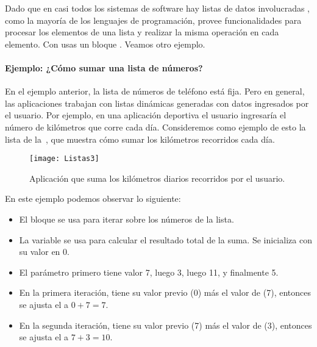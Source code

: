 {{Dado que en casi todos los sistemas de software hay listas de datos
involucradas \AppInventor, como la mayoría de los lenguajes de
programación, provee funcionalidades para procesar los elementos de
una lista y realizar la misma operación en cada elemento. Con
\AppInventor usas un bloque . Veamos otro
ejemplo.

\paragraph{Ejemplo: ¿Cómo sumar una lista de números?}

En el ejemplo anterior, la lista de números de teléfono está
fija. Pero en general, las aplicaciones trabajan con listas dinámicas
generadas con datos ingresados por el usuario. Por ejemplo, en una
aplicación deportiva el usuario ingresaría el número de kilómetros que
corre cada día. Consideremos como ejemplo de esto la lista de
la~, que muestra cómo sumar los kilómetros
recorridos cada día.

\begin{figure}[H]
\vspace{3em}
\centering
\texttt{[image: Listas3]}
\caption{Aplicación que suma los kilómetros diarios recorridos por el
  usuario.}
\label{fig:Listas3}
\end{figure}

En este ejemplo podemos observar lo siguiente:

\begin{itemize}
\item El bloque  se usa para iterar sobre los números
  de la lista.

\item La variable  se usa para calcular el resultado
  total de la suma. Se inicializa con su valor en 0.

\item El parámetro  primero tiene valor 7, luego
  3, luego 11, y finalmente 5.

\item En la primera iteración,  tiene su valor previo
  (0) más el valor de  (7), entonces se ajusta el
   a $0+7 = 7$.

\item En la segunda iteración,  tiene su valor previo
  (7) más el valor de  (3), entonces se ajusta el
   a $7+3 = 10$.


\end{itemize}}}
